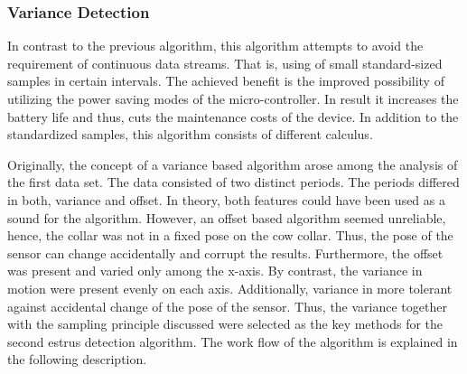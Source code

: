 \documentclass[english,12pt,a4paper,pdftex,elec,utf8]{aaltothesis}
\begin{document}
\subsubsection{Variance Detection} \label{variancedetectionsection}

In contrast to the previous algorithm, this algorithm attempts to avoid the requirement of continuous data streams. That is, using of small standard-sized samples in certain intervals. The achieved benefit is the improved possibility of utilizing the power saving modes of the micro-controller. In result it increases the battery life and thus, cuts the maintenance costs of the device. In addition to the standardized samples, this algorithm consists of different calculus. 

Originally, the concept of a variance based algorithm arose among the analysis of the first data set. The data consisted of two distinct periods. The periods differed in both, variance and offset. In theory, both features could have been used as a sound for the algorithm. However, an offset based algorithm seemed unreliable, hence, the collar was not in a fixed pose on the cow collar. Thus, the pose of the sensor can change accidentally and corrupt the results. Furthermore, the offset was present and varied only among the x-axis. By contrast, the variance in motion were present evenly on each axis. Additionally, variance in more tolerant against accidental change of the pose of the sensor. Thus, the variance together with the sampling principle discussed were selected as the key methods for the second estrus detection algorithm. The work flow of the algorithm is explained in the following description.
\end{document}
